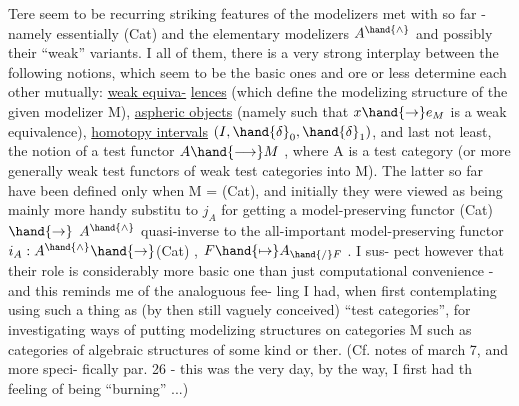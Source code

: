 Tere seem to be recurring striking features of the modelizers met
with so far  -  namely essentially (Cat) and the elementary modelizers $A^{\hand{\wedge}}$
and possibly their ``weak'' variants.  I all of them,  there is a very
strong interplay between the following notions,  which seem to be the
basic ones and ore or less determine each other mutually:  \uline{weak equiva-}%
\uline{lences} (which define the modelizing structure of the given modelizer M),
\uline{aspheric objects}  (namely such that  $x \hand{\to} e_M$ is a weak equivalence),
\uline{homotopy intervals}  $(I,\hand{\delta}_0,\hand{\delta}_1)$,  and last not least,  the notion of a test
functor  $A \hand{\longrightarrow} M$ ,  where A is a test category (or more generally weak
test functors of weak test categories into M).  The latter so far have
been defined only when M = (Cat),  and initially they were viewed 
as being mainly  more handy substitu to  $j_A$\hand{,} for getting a
model-preserving functor (Cat)$\hand{\to}$ $A^{\hand{\wedge}}$ quasi-inverse to the all-important
 model-preserving functor   $i_A : A^{\hand{\wedge}}\hand{\to}$(Cat) ,  $F \hand{\mapsto} A_{\hand{/}F}$ .  I sus-%
pect however that their role is  considerably more basic one than just
computational convenience  -  and this reminds me of the analoguous fee-%
ling I had,  when first contemplating using such a thing as (by then still
vaguely conceived) ``test categories'',  for investigating ways of putting
modelizing structures on categories M such as categories of algebraic
structures of some kind or ther. (Cf. notes of march 7,  and more speci-%
fically par. 26  -  this was the very day,  by the way,  I first had th
feeling of being ``burning'' ...)

